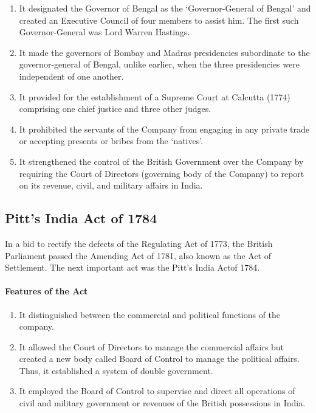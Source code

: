 \begin{multicols}{2}
\begin{enumerate}
  \item It designated the Governor of Bengal as the `Governor-General of Bengal' and created an Executive Council of four members to assist him. The first such Governor-General was Lord Warren Hastings.
  \item It made the governors of Bombay and Madras presidencies subordinate to the governor-general of Bengal, unlike earlier, when the three presidencies were independent of one another.
  \item It provided for the establishment of a Supreme Court at Calcutta (1774) comprising one chief justice and three other judges.
  \item It prohibited the servants of the Company from engaging in any private trade or accepting presents or bribes from the `natives'.
  \item It strengthened the control of the British Government over the Company by requiring the Court of Directors (governing body of the Company) to report on its revenue, civil, and military affairs in India.
\end{enumerate}

\subsection{Pitt's India Act of 1784}
In a bid to rectify the defects of the Regulating Act of 1773, the British Parliament passed the Amending Act of 1781, also known as the Act of Settlement. The next important act was the Pitt's India Act\endnote of 1784.

\paragraph{Features of the Act}
\begin{enumerate}
  \item It distinguished between the commercial and political functions of the company.
  \item It allowed the Court of Directors to manage the commercial affairs but created a new body called Board of Control to manage the political affairs. Thus, it established a system of double government.
  \item It employed the Board of Control to supervise and direct all operations of civil and military government or revenues of the British possessions in India.
\end{enumerate}


\end{multicols}
